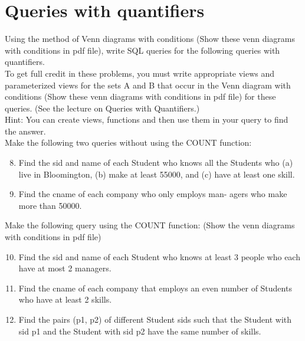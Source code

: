 \documentclass{article}
\begin{document}
\newpage

\section{Queries with quantifiers}
Using the method of Venn diagrams with conditions
(Show these venn diagrams with conditions in pdf file),
write SQL queries for the following queries with quantifiers.\\
To get full credit in these problems, you must write appropriate views and parameterized views for the sets A and
B that occur in the Venn diagram with conditions (Show these venn diagrams with conditions in pdf file) for these
queries. (See the lecture on Queries with Quantifiers.)\\
Hint: You can create views, functions and then use them in your query to find the answer.\\
Make the following two queries without using the COUNT function:
\begin{enumerate}
\setcounter{enumi}{7}
    \item Find the sid and name of each Student who knows all the
Students who (a) live in Bloomington, (b) make at least
55000, and (c) have at least one skill.

\item Find the cname of each company who only employs man-
agers who make more than 50000.
\end{enumerate}
Make the following query using the COUNT function: (Show the venn diagrams with conditions in pdf file)
\begin{enumerate}
\setcounter{enumi}{9}
\item Find the sid and name of each Student who knows at least
3 people who each have at most 2 managers.
\item Find the cname of each company that employs an even
number of Students who have at least 2 skills.
\item Find the pairs (p1, p2) of different Student sids such that the Student with sid p1 and the Student with sid p2 have the
same number of skills.
\end{enumerate}
\newpage
\end{document}
